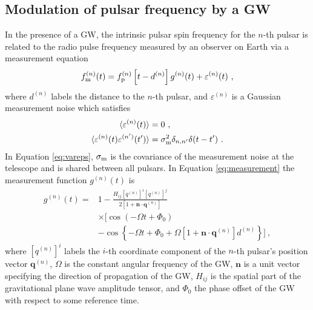 \documentclass[fleqn,usenatbib,useAMS]{mnras}
\begin{document}
\subsection{Modulation of pulsar frequency by a GW} \label{sec:psr_measured}
In the presence of a GW, the intrinsic pulsar spin frequency for the $n$-th pulsar is related to the radio pulse frequency measured by an observer on Earth via a measurement equation
\begin{equation}
	f_{\rm m}^{(n)}(t) = f_{\rm p}^{(n)}\left [t-d^{(n)} \right ] g^{(n)}(t) +  \varepsilon^{(n)}(t)\ ,
	\label{eq:measurement}
\end{equation}
where $d^{(n)}$ labels the distance to the $n$-th pulsar, and $\varepsilon^{(n)}$ is a Gaussian measurement noise which satisfies 
\begin{align}
	\langle \varepsilon^{(n)}(t) \rangle &= 0 \ , \\
	\langle \varepsilon^{(n)}(t) \varepsilon^{(n')}(t') \rangle &= \sigma_{\rm m}^2 \delta_{n,n'} \delta(t - t') \ .	\label{eq:vareps}
\end{align}
In Equation \eqref{eq:vareps}, $\sigma_{\rm m}$ is the covariance of the measurement noise at the telescope and is shared between all pulsars. In Equation \eqref{eq:measurement} the measurement function $g^{(n)}(t)$ is
\begin{align}
	g^{(n)}(t) =& 1 - \frac{ H_{ij}[q^{(n)}]^i [q^{(n)}]^j }{2 [1 + \boldsymbol{n}\cdot \boldsymbol{q}^{(n)}] } \nonumber \\
	& \times \Big[\cos\left(-\Omega t +\Phi_0\right) \nonumber \\
	&- \cos \left \{-\Omega t +\Phi_0 + \Omega \left[1 + \boldsymbol{n}\cdot \boldsymbol{q}^{(n)} \right]  d^{(n)} \right \} \Big ] \ ,
	\label{eq:g_func_trig}
\end{align}
where $[q^{(n)}]^i$ labels the $i$-th coordinate component of the $n$-th pulsar's position vector $\boldsymbol{q}^{(n)}$, $\Omega$ is the constant angular frequency of the GW, $\boldsymbol{n}$ is a unit vector specifying the direction of propagation of the GW, $H_{ij}$ is the spatial part of the gravitational plane wave amplitude tensor, and $\Phi_0$ the phase offset of the GW with respect to some reference time. \newline  
\end{document}
